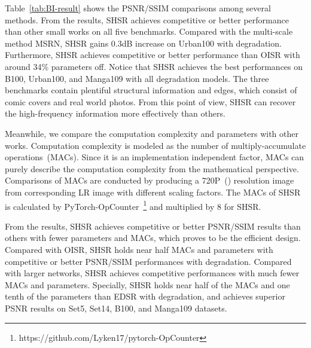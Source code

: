 \documentclass[manuscript,screen]{acmart}
\begin{document}
Table~\ref{tab:BI-result} shows the PSNR/SSIM comparisons among several methods. From the results, SHSR achieves competitive or better performance than other small works on all five benchmarks. Compared with the multi-scale method MSRN, SHSR gains 0.3dB increase on Urban100 with  degradation. Furthermore, SHSR achieves competitive or better performance than OISR with around 34\% parameters off. Notice that SHSR achieves the best performances on B100, Urban100, and Manga109 with all degradation models. The three benchmarks contain plentiful structural information and edges, which consist of comic covers and real world photos. From this point of view, SHSR can recover the high-frequency information more effectively than others.

Meanwhile, we compare the computation complexity and parameters with other works. 
Computation complexity is modeled as the number of multiply-accumulate operations~(MACs). Since it is an implementation independent factor, MACs can purely describe the computation complexity from the mathematical perspective. Comparisons of MACs are conducted by producing a 720P~() resolution image from corresponding LR image with different scaling factors. The MACs of SHSR is calculated by PyTorch-OpCounter~\footnote{https://github.com/Lyken17/pytorch-OpCounter} and multiplied by 8 for SHSR.

From the results, SHSR achieves competitive or better PSNR/SSIM results than others with fewer parameters and MACs, which proves to be the efficient design. Compared with OISR, SHSR holds near half MACs and parameters with competitive or better PSNR/SSIM performances with  degradation. Compared with larger networks, SHSR achieves competitive performances with much fewer MACs and parameters. Specially, SHSR holds near half of the MACs and one tenth of the parameters than EDSR with  degradation, and achieves superior PSNR results on Set5, Set14, B100, and Manga109 datasets.
\end{document}
